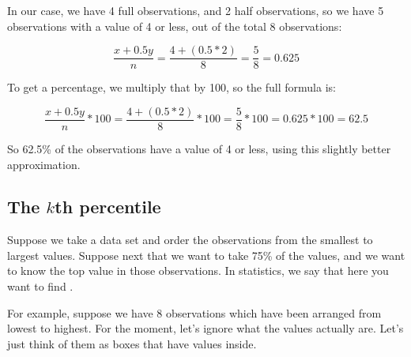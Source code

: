 \documentclass[../../../main.tex]{subfiles}
\begin{document}
\noindent
In our case, we have 4 full observations, and 2 half observations, so we have 5 observations with a value of 4 or less, out of the total 8 observations:

\begin{equation*}
  \frac{x + 0.5y}{n} = \frac{4 + (0.5 * 2)}{8} = \frac{5}{8} = 0.625
\end{equation*}

\noindent
To get a percentage, we multiply that by 100, so the full formula is:

\begin{equation*}
  \frac{x + 0.5y}{n} * 100 = \frac{4 + (0.5 * 2)}{8} * 100 = \frac{5}{8} * 100 = 0.625 * 100 = 62.5
\end{equation*}

\noindent
So 62.5\% of the observations have a value of 4 or less, using this slightly better approximation.


\subsection{The $k$th percentile}

Suppose we take a data set and order the observations from the smallest to largest values. Suppose next that we want to take 75\% of the values, and we want to know the top value in those observations. In statistics, we say that here you want to find .

For example, suppose we have 8 observations which have been arranged from lowest to highest. For the moment, let's ignore what the values actually are. Let's just think of them as boxes that have values inside.
\end{document}
